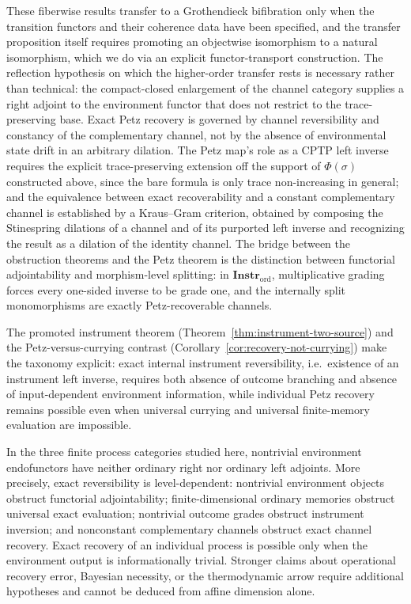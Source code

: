 \documentclass[11pt]{article}
\begin{document}
These fiberwise results transfer to a Grothendieck bifibration only when
the transition functors and their coherence data have been specified, and
the transfer proposition itself requires promoting an objectwise isomorphism
to a natural isomorphism, which we do via an explicit functor-transport
construction. The reflection hypothesis on which the higher-order transfer
rests is necessary rather than technical: the compact-closed enlargement of
the channel category supplies a right adjoint to the environment functor that
does not restrict to the trace-preserving base. Exact Petz recovery is governed by channel reversibility and
constancy of the complementary channel, not by the absence of environmental
state drift in an arbitrary dilation. The Petz map's role as a CPTP left
inverse requires the explicit trace-preserving extension off the support of
$\Phi(\sigma)$ constructed above, since the bare formula is only trace
non-increasing in general; and the equivalence between exact recoverability
and a constant complementary channel is established by a Kraus--Gram
criterion, obtained by composing the Stinespring dilations of a channel and
of its purported left inverse and recognizing the result as a dilation of
the identity channel. The bridge between the obstruction theorems and the
Petz theorem is the distinction between functorial adjointability and
morphism-level splitting: in $\mathbf{Instr}_{\mathrm{ord}}$,
multiplicative grading forces every one-sided inverse to be grade one, and
the internally split monomorphisms are exactly Petz-recoverable channels.

The promoted instrument theorem (Theorem~\ref{thm:instrument-two-source})
and the Petz-versus-currying contrast
(Corollary~\ref{cor:recovery-not-currying}) make the taxonomy explicit:
exact internal instrument reversibility, i.e.\ existence of an instrument
left inverse, requires both absence of outcome branching and absence of
input-dependent environment information, while individual Petz recovery
remains possible even when universal currying and universal finite-memory
evaluation are impossible.

In the three finite process categories studied here, nontrivial environment
endofunctors have neither ordinary right nor ordinary left adjoints. More
precisely, exact reversibility is level-dependent: nontrivial environment
objects obstruct functorial adjointability; finite-dimensional ordinary
memories obstruct universal exact evaluation; nontrivial outcome grades
obstruct instrument inversion; and nonconstant complementary channels
obstruct exact channel recovery. Exact recovery of an individual process is
possible only when the environment output is informationally trivial.
Stronger claims about operational recovery error, Bayesian necessity, or
the thermodynamic arrow require additional hypotheses and cannot be deduced
from affine dimension alone.
\end{document}
